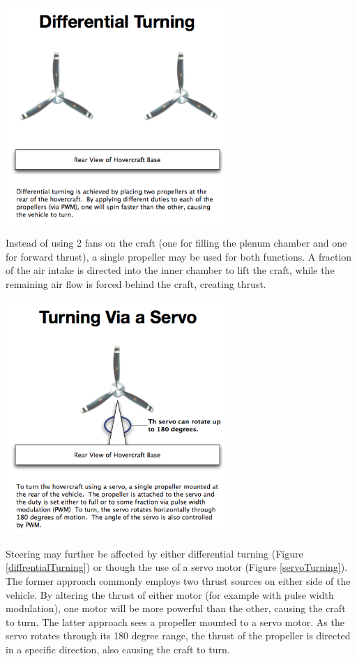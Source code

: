   \begin{center}
    \includegraphics[width=85mm]{imageSources/differentialTurning.png}
  \end{center}
  \label{differentialTurning}


Instead of using 2 fans on the craft (one for filling the plenum chamber and one for forward thrust), a single propeller may be used for both functions. A fraction of the air intake is directed into the inner chamber to lift the craft, while the remaining air flow is forced behind the craft, creating thrust.


  \begin{center}
    \includegraphics[width=85mm]{imageSources/servoTurning.png}
  \end{center}
  \label{servoTurning}


Steering may further be affected by either differential turning (Figure \ref{diffrentialTurning}) or though the use of a servo motor (Figure \ref{servoTurning}). The former approach commonly employs two thrust sources on either side of the vehicle. By altering the thrust of either motor (for example with pulse width modulation), one motor will be more powerful than the other, causing the craft to turn. The latter approach sees a propeller mounted to a servo motor. As the servo rotates through its 180 degree range, the thrust of the propeller is directed in a specific direction, also causing the craft to turn.

